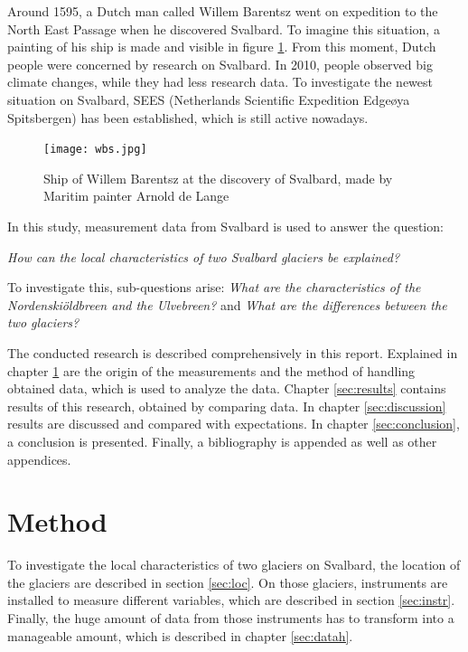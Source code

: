 \documentclass[11pt]{report}
\begin{document}
Around 1595, a Dutch man called Willem Barentsz went on expedition to the North East Passage when he discovered  Svalbard. \cite{sval} To imagine this situation, a painting of his ship is made and visible in figure \ref{fig:wbs}. From this moment, Dutch people were concerned by research on Svalbard. In 2010, people observed big climate changes, while they had less research data. To investigate the newest situation on Svalbard, SEES (Netherlands Scientific Expedition Edgeøya Spitsbergen) has been established, which is still active nowadays. \cite{sees} 

\begin{figure}[h]
\texttt{[image: wbs.jpg]}
\centering{}
\caption{Ship of Willem Barentsz at the discovery of Svalbard, made by Maritim painter Arnold de Lange}
\label{fig:wbs}
\end{figure}

In this study, measurement data from Svalbard is used to answer the question:

\textit{How can the local characteristics of two Svalbard glaciers be explained?}

To investigate this, sub-questions arise:
\textit{What are the characteristics of the Nordenskiöldbreen and the Ulvebreen?} and \textit{What are the differences between the two glaciers?}

The conducted research is described comprehensively in this report. Explained in chapter \ref{sec:method} are the origin of the measurements and the method of handling obtained data,  which is used to analyze the data. Chapter \ref{sec:results} contains results of this research, obtained by comparing data. In chapter \ref{sec:discussion} results are discussed and compared with expectations. In chapter \ref{sec:conclusion}, a conclusion is presented. Finally, a bibliography is appended as well as other appendices.

\newpage

\chapter{Method}\label{sec:method}

To investigate the local characteristics of two glaciers on Svalbard, the location of the glaciers are described in section \ref{sec:loc}. On those glaciers, instruments are installed to measure different variables, which are described in section \ref{sec:instr}. Finally, the huge amount of data from those instruments has to transform into a manageable amount, which is described in chapter \ref{sec:datah}.
\end{document}

